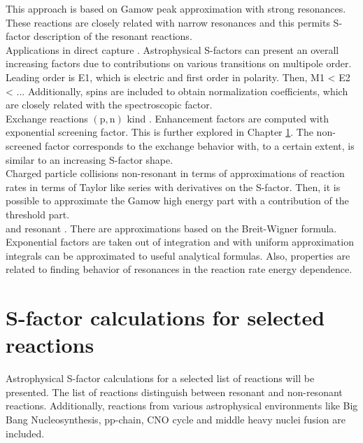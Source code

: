 \documentclass[openany]{book}
\begin{document}
This approach is based on Gamow peak approximation with strong resonances. These reactions are closely related with narrow resonances and this permits S-factor description of the resonant reactions.   \\

Applications in direct capture \cite{jennings_karataglidis_shoppa_1998}. Astrophysical S-factors can present an overall increasing factors due to contributions on various transitions on multipole order.  Leading order is E1, which is electric and first order in polarity. Then, M1 < E2 < ...  Additionally, spins are included to obtain normalization coefficients, which are closely related with the spectroscopic factor. \\

 Exchange reactions $\mathrm{(p, n)}$ kind \cite{hussein_abdullah_2020}. Enhancement factors are computed with exponential screening factor. This is further explored in Chapter \ref{ch:sfactorCalculations}. The non-screened factor corresponds to the exchange behavior with, to a certain extent, is similar to an increasing S-factor shape. \\

Charged particle collisions non-resonant \cite{ueda_sargeant_pato_hussein_2002} in terms of approximations of reaction rates in terms of Taylor like series with derivatives on the S-factor.  Then, it is possible to approximate the Gamow high energy part with a contribution of the threshold part.  \\

 and resonant \cite{ueda_sargeant_pato_hussein_2004}. There are approximations based on the Breit-Wigner formula. Exponential factors are taken out of integration and with uniform approximation integrals can be approximated to useful analytical formulas. Also, properties are related to finding behavior of resonances in the reaction rate energy dependence.  \\


\chapter{S-factor calculations for selected reactions} \label{ch:sfactorCalculations}

Astrophysical S-factor calculations for a selected list of reactions will be presented. The list of reactions distinguish between resonant and non-resonant reactions. Additionally, reactions from various astrophysical environments like Big Bang Nucleosynthesis, pp-chain, CNO cycle and middle heavy nuclei fusion are included.  \\
\end{document}
